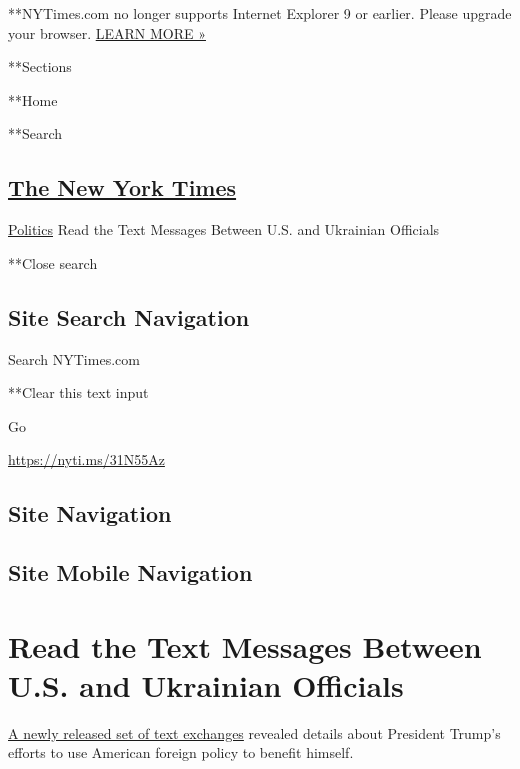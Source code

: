  **NYTimes.com no longer supports Internet Explorer 9 or earlier. Please
upgrade your browser.
\href{http://www.nytimes3xbfgragh.onion/content/help/site/ie9-support.html}{LEARN
MORE »}

**Sections

**Home

**Search

\hypertarget{the-new-york-times}{%
\subsection{\texorpdfstring{\href{http://www.nytimes3xbfgragh.onion/}{The
New York Times}}{The New York Times}}\label{the-new-york-times}}

 \href{/section/politics}{Politics} \textbar{}Read the Text Messages
Between U.S. and Ukrainian Officials

**Close search

\hypertarget{site-search-navigation}{%
\subsection{Site Search Navigation}\label{site-search-navigation}}

Search NYTimes.com

**Clear this text input

Go

\url{https://nyti.ms/31N55Az}

\hypertarget{site-navigation}{%
\subsection{Site Navigation}\label{site-navigation}}

\hypertarget{site-mobile-navigation}{%
\subsection{Site Mobile Navigation}\label{site-mobile-navigation}}

\hypertarget{read-the-text-messages-between-us-and-ukrainian-officials}{%
\section{Read the Text Messages Between U.S. and Ukrainian
Officials}\label{read-the-text-messages-between-us-and-ukrainian-officials}}

\href{https://www.nytimes3xbfgragh.onion/2019/10/03/us/politics/kurt-volker-impeachment.html}{A
newly released set of text exchanges} revealed details about President
Trump's efforts to use American foreign policy to benefit himself.

